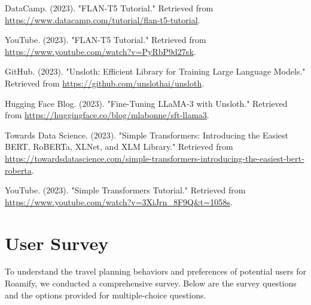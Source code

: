 \documentclass[conference]{IEEEtran}
\begin{document}
\begin{thebibliography}{1}
        DataCamp. (2023). "FLAN-T5 Tutorial." Retrieved from \url{https://www.datacamp.com/tutorial/flan-t5-tutorial}.

        YouTube. (2023). "FLAN-T5 Tutorial." Retrieved from \url{https://www.youtube.com/watch?v=PyRbP9d27sk}.

        GitHub. (2023). "Unsloth: Efficient Library for Training Large Language Models." Retrieved from \url{https://github.com/unslothai/unsloth}.

        Hugging Face Blog. (2023). "Fine-Tuning LLaMA-3 with Unsloth." Retrieved from \url{https://huggingface.co/blog/mlabonne/sft-llama3}.

        Towards Data Science. (2023). "Simple Transformers: Introducing the Easiest BERT, RoBERTa, XLNet, and XLM Library." Retrieved from \url{https://towardsdatascience.com/simple-transformers-introducing-the-easiest-bert-roberta}.

        YouTube. (2023). "Simple Transformers Tutorial." Retrieved from \url{https://www.youtube.com/watch?v=3XiJrn_8F9Q&t=1058s}.

\end{thebibliography}


\appendix

\section{User Survey}
    To understand the travel planning behaviors and preferences of potential users for Roamify, we conducted a comprehensive survey. Below are the survey questions and the options provided for multiple-choice questions.
    \\
\end{document}
